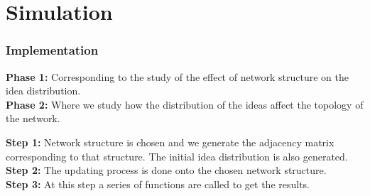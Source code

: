 \documentclass{beamer}
\begin{document}
\section{Simulation}
\begin{frame}
\frametitle{Implementation}
\textbf{Phase 1:} Corresponding to the study  of the effect of network structure on the idea distribution.\\ \pause
\textbf{Phase 2:} Where we study how the distribution of the ideas affect the topology of the network. \\ \pause
\end{frame}
%
\begin{frame}
\noindent \textbf{Step 1:} Network structure is chosen and we generate the adjacency matrix corresponding to that structure. The initial idea distribution is also generated.\\ \pause
\textbf{Step 2:} The updating process is done onto the chosen network structure.\\ \pause
\textbf{Step 3:} At this step a series of functions are called to get the results.
\end{frame}
%
\end{document}

